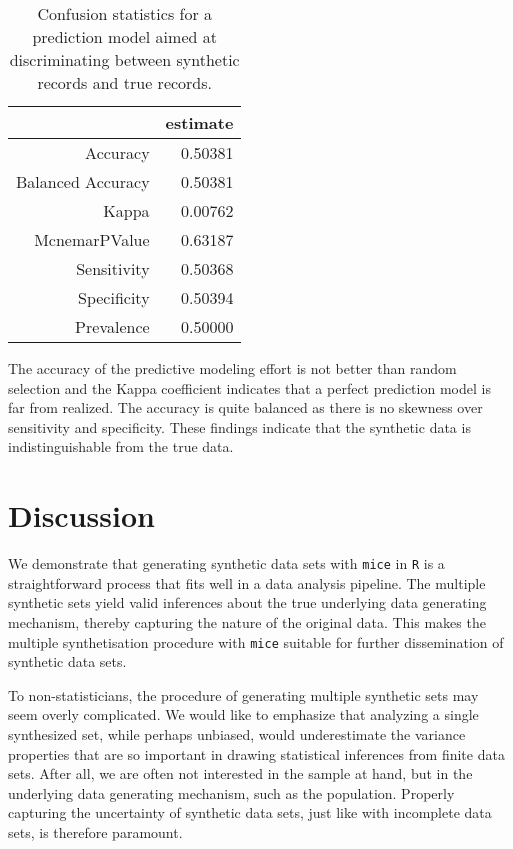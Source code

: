 \documentclass[psych,article,submit,moreauthors,pdftex]{mdpi}
\begin{document}
\begin{table}[H]
\caption{Confusion statistics for a prediction model aimed at discriminating between synthetic records and true records.}
\centering
\begin{tabular}{rr}
  \hline
& estimate\\
  \hline
 Accuracy & 0.50381 \\
 Balanced Accuracy & 0.50381 \\
 Kappa & 0.00762 \\
 McnemarPValue & 0.63187 \\
 Sensitivity & 0.50368 \\
 Specificity & 0.50394 \\
 Prevalence & 0.50000 \\
   \hline
\end{tabular}
\end{table}

The accuracy of the predictive modeling effort is not better than random
selection and the Kappa coefficient indicates that a perfect prediction
model is far from realized. The accuracy is quite balanced as there is
no skewness over sensitivity and specificity. These findings indicate
that the synthetic data is indistinguishable from the true data.

\hypertarget{discussion}{%
\section{Discussion}\label{discussion}}

We demonstrate that generating synthetic data sets with \texttt{mice} in
\texttt{R} is a straightforward process that fits well in a data
analysis pipeline. The multiple synthetic sets yield valid inferences
about the true underlying data generating mechanism, thereby capturing
the nature of the original data. This makes the multiple synthetisation
procedure with \texttt{mice} suitable for further dissemination of
synthetic data sets.

To non-statisticians, the procedure of generating multiple synthetic
sets may seem overly complicated. We would like to emphasize that
analyzing a single synthesized set, while perhaps unbiased, would
underestimate the variance properties that are so important in drawing
statistical inferences from finite data sets. After all, we are often
not interested in the sample at hand, but in the underlying data
generating mechanism, such as the population. Properly capturing the
uncertainty of synthetic data sets, just like with incomplete data sets,
is therefore paramount.
\end{document}

